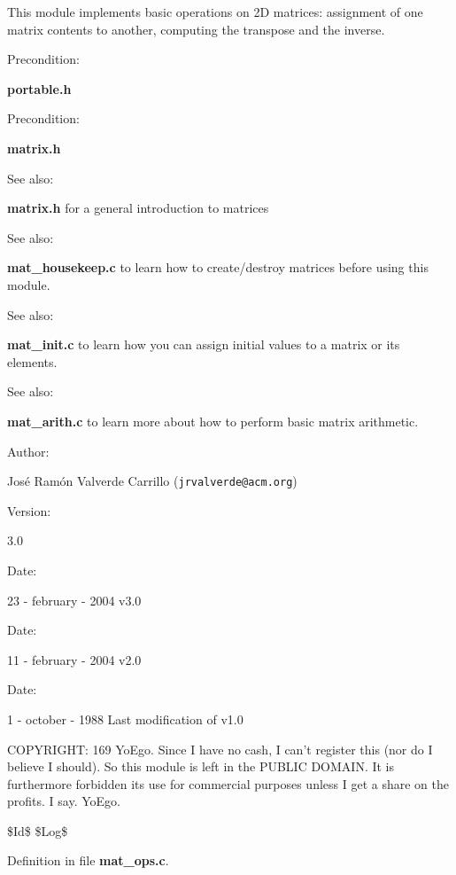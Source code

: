 This module implements basic operations on 2D matrices: assignment of one matrix contents to another, computing the transpose and the inverse.

\begin{Desc}
\item[Precondition: ]\par
{\bf portable.h}\end{Desc}
\begin{Desc}
\item[Precondition: ]\par
{\bf matrix.h}\end{Desc}
\begin{Desc}
\item[See also: ]\par
{\bf matrix.h} for a general introduction to matrices\end{Desc}
\begin{Desc}
\item[See also: ]\par
{\bf mat\_\-housekeep.c} to learn how to create/destroy matrices before using this module.\end{Desc}
\begin{Desc}
\item[See also: ]\par
{\bf mat\_\-init.c} to learn how you can assign initial values to a matrix or its elements.\end{Desc}
\begin{Desc}
\item[See also: ]\par
{\bf mat\_\-arith.c} to learn more about how to perform basic matrix arithmetic.\end{Desc}
\begin{Desc}
\item[Author: ]\par
Jos\'{e} Ram\'{o}n Valverde Carrillo ({\tt jrvalverde@acm.org})\end{Desc}
\begin{Desc}
\item[Version: ]\par
3.0\end{Desc}
\begin{Desc}
\item[Date: ]\par
23 - february - 2004 v3.0\end{Desc}
\begin{Desc}
\item[Date: ]\par
11 - february - 2004 v2.0\end{Desc}
\begin{Desc}
\item[Date: ]\par
1 - october - 1988 Last modification of v1.0\end{Desc}
COPYRIGHT: 169 Yo\-Ego. Since I have no cash, I can't register this (nor do I believe I should). So this module is left in the PUBLIC DOMAIN. It is furthermore forbidden its use for commercial purposes unless I get a share on the profits. I say. Yo\-Ego.

\$Id\$ \$Log\$



Definition in file {\bf mat\_\-ops.c}.